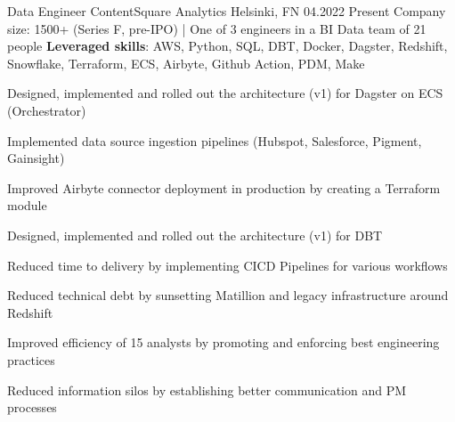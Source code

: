 

\begin{cventries}

\cventry
{Data Engineer} %
{ContentSquare} %
{Analytics} %
{Helsinki, FN} %
{04.2022} %
{Present} %
{Company size: 1500+ (Series F, pre-IPO) | One of 3 engineers in a BI Data team of 21 people} %
{\textbf{Leveraged skills}: AWS, Python, SQL, DBT, Docker, Dagster, Redshift, Snowflake, Terraform, ECS, Airbyte, Github Action, PDM, Make } %
{
  \begin{cvitems} %
    \item {Designed, implemented and rolled out the architecture (v1) for Dagster on ECS (Orchestrator)}
    \item {Implemented data source ingestion pipelines (Hubspot, Salesforce, Pigment, Gainsight)}
    \item {Improved Airbyte connector deployment in production by creating a Terraform module}
    \item {Designed, implemented and rolled out the architecture (v1) for DBT}
    \item {Reduced time to delivery by implementing CICD Pipelines for various workflows}
    \item {Reduced technical debt by sunsetting Matillion and legacy infrastructure around Redshift}
    \item {Improved efficiency of 15 analysts by promoting and enforcing best engineering practices }
    \item {Reduced information silos by establishing better communication and PM processes}
  \end{cvitems}
}


\end{cventries}
